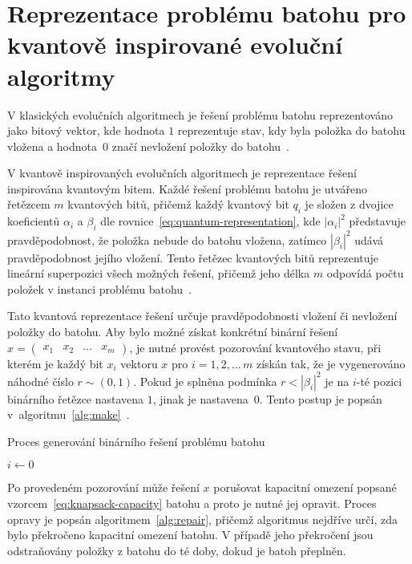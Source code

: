 \section{Reprezentace problému batohu pro kvantově inspirované evoluční algoritmy}
V klasických evolučních algoritmech je řešení problému batohu reprezentováno jako bitový vektor, kde hodnota $1$ reprezentuje stav, kdy byla položka do batohu vložena a hodnota~$0$ značí nevložení položky do batohu~\cite{qiga}.

V kvantově inspirovaných evolučních algoritmech je reprezentace řešení inspirována kvantovým bitem. 
Každé řešení problému batohu je utvářeno řetězcem $m$ kvantových bitů, přičemž každý kvantový bit $q_i$ je složen z dvojice koeficientů $\alpha_i$ a $\beta_i$ dle rovnice~\ref{eq:quantum-representation}, kde $\left| \alpha_i \right|^2$ představuje pravděpodobnost, že položka nebude do batohu vložena, zatímco $\left| \beta_i \right|^2$ udává pravděpodobnost jejího vložení. 
Tento řetězec kvantových bitů reprezentuje lineární superpozici všech možných řešení, přičemž jeho délka $m$ odpovídá počtu položek v instanci problému batohu~\cite{qiga}.

Tato kvantová reprezentace řešení určuje pravděpodobnosti vložení či nevložení položky do batohu. 
Aby bylo možné získat konkrétní binární řešení $x = \begin{pmatrix} x_1 & x_2 & \dots & x_m \end{pmatrix}$, je nutné provést pozorování kvantového stavu, při kterém je každý bit $x_i$ vektoru $x$ pro $i = 1,2,\dots\,m$ získán tak, že je vygenerováno náhodné číslo $r \sim \left(0,1\right)$. 
Pokud je splněna podmínka $r < \left| \beta_i \right|^2$ je na $i$-té pozici binárního řetězce nastavena $1$, jinak je nastavena~$0$. 
Tento postup je popsán v~algoritmu~\ref{alg:make}~\cite{qiga}.

\begin{algorithm}[ht!]
    \caption{Proces generování binárního řešení problému batohu~\cite{qiga}}
    \label{alg:make}
    $i \gets 0$\;
\end{algorithm}

Po provedeném pozorování může řešení $x$ porušovat kapacitní omezení popsané vzorcem~\ref{eq:knapsack-capacity} batohu a proto je nutné jej opravit. 
Proces opravy je popsán algoritmem~\ref{alg:repair}, přičemž algoritmus nejdříve určí, zda bylo překročeno kapacitní omezení batohu. 
V případě jeho překročení jsou odstraňovány položky z batohu do té doby, dokud je batoh přeplněn. 

